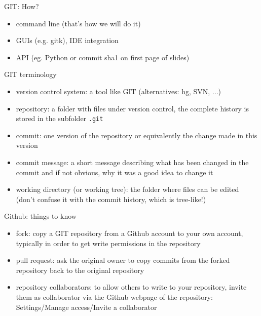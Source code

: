 \begin{frame}[fragile]{GIT: How?}
    \begin{itemize}
        \item command line (that's how we will do it)
        \item GUIs (e.g. gitk), IDE integration
        \item API (eg. Python or commit sha1 on first page of slides)
    \end{itemize}
\end{frame}


\begin{frame}[fragile]{GIT terminology}
    \begin{itemize}
        \item version control system: a tool like GIT (alternatives: hg, SVN, ...)
        \item repository: a folder with files under version control, the complete history is
            stored in the subfolder \verb|.git|
        \item commit: one version of the repository or equivalently the change made in this
            version
        \item commit message: a short message describing what has been changed in the commit
            and if not obvious, why it was a good idea to change it
        \item working directory (or working tree): the folder where files can be edited (don't
            confuse it with the commit history, which is tree-like!)
    \end{itemize}
\end{frame}


\begin{frame}[fragile]{Github: things to know}
    \begin{itemize}
        \item fork: copy a GIT repository from a Github account to your own account, typically in
            order to get write permissions in the repository
        \item pull request: ask the original owner to copy commits from the forked repository
            back to the original repository
        \item repository collaborators: to allow others to write to your repository,
            invite them as collaborator via the Github webpage of the repository:\\
            Settings/Manage access/Invite a collaborator
    \end{itemize}
\end{frame}


